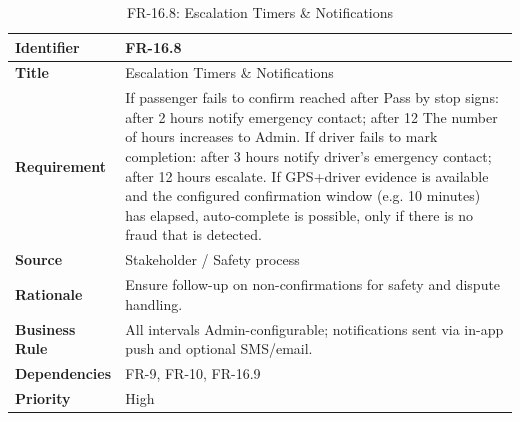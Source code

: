 \begin{longtable}{|p{3cm}|p{12cm}|}

\caption{FR-16.8: Escalation Timers \& Notifications}

\label{tab:fr-16-8} \\

\hline

\rowcolor{lightgray!30}

\textbf{Identifier} & FR-16.8 \\

\hline

\textbf{Title} & Escalation Timers \& Notifications \\

\hline

\textbf{Requirement} & If passenger fails to confirm reached after Pass by stop signs: after 2 hours notify emergency contact; after 12 The number of hours increases to Admin. If driver fails to mark completion: after 3 hours notify driver’s emergency contact; after 12 hours escalate. If GPS+driver evidence is available and the configured confirmation window (e.g. 10 minutes) has elapsed, auto-complete is possible, only if there is no fraud that is detected.\\

\hline

\textbf{Source} & Stakeholder / Safety process \\

\hline

\textbf{Rationale} & Ensure follow-up on non-confirmations for safety and dispute handling. \\

\hline

\textbf{Business Rule} & All intervals Admin-configurable; notifications sent via in-app push and optional SMS/email. \\

\hline

\textbf{Dependencies} & FR-9, FR-10, FR-16.9 \\

\hline

\textbf{Priority} & High \\

\hline

\end{longtable}




